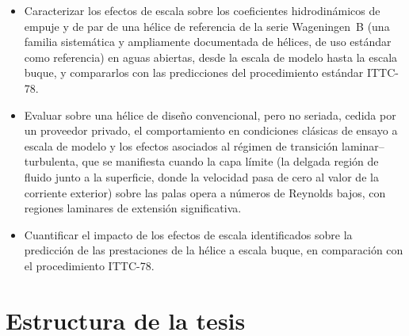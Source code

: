 \begin{itemize}
    \item Caracterizar los efectos de escala sobre los coeficientes
    hidrodinámicos de empuje y de par de una hélice de referencia de la serie Wageningen~B (una
    familia sistemática y ampliamente documentada de hélices, de uso estándar
    como referencia) en aguas abiertas, desde la escala de modelo hasta la
    escala buque, y compararlos con las predicciones del procedimiento
    estándar ITTC-78.
    \item Evaluar sobre una hélice de diseño convencional, pero no seriada,
    cedida por un proveedor privado, el comportamiento en condiciones clásicas
    de ensayo a escala de modelo y los efectos asociados al régimen de
    transición laminar--turbulenta, que se manifiesta cuando la capa límite (la
    delgada región de fluido junto a la superficie, donde la velocidad pasa de
    cero al valor de la corriente exterior) sobre las palas opera a números de
    Reynolds bajos, con regiones laminares de extensión significativa.
    \item Cuantificar el impacto de los efectos de escala identificados sobre
    la predicción de las prestaciones de la hélice a escala buque, en
    comparación con el procedimiento ITTC-78.
\end{itemize}

\section{Estructura de la tesis}

